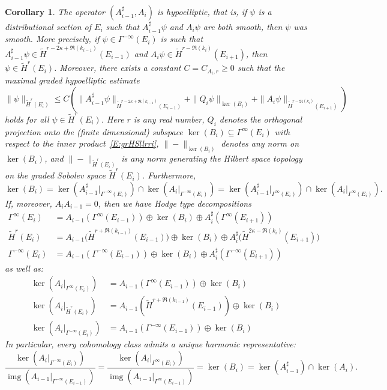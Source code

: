 \documentclass[reqno,12pt]{amsart}
\DeclareMathOperator{\img}{img}
\theoremstyle{plain}
\newtheorem{corollary}[theorem]{Corollary}
\theoremstyle{definition}
\begin{document}
\begin{corollary}\label{C:grHodge}
The operator $(A_{i-1}^\sharp,A_i)$ is hypoelliptic, that is, if $\psi$ is a distributional section of $E_i$ such that $A_{i-1}^\sharp\psi$ and $A_i\psi$ are both smooth, then $\psi$ was smooth.
More precisely, if $\psi\in\Gamma^{-\infty}(E_i)$ is such that $A_{i-1}^\sharp\psi\in\tilde H^{r-2\kappa+\Re(k_{i-1})}(E_{i-1})$ and $A_i\psi\in\tilde H^{r-\Re(k_i)}(E_{i+1})$, then $\psi\in\tilde H^r(E_i)$.
Moreover, there exists a constant $C=C_{A_i,r}\geq0$ such that the maximal graded hypoelliptic estimate
\begin{equation*}
\|\psi\|_{\tilde H^r(E_i)}\leq C\left(\|A^\sharp_{i-1}\psi\|_{\tilde H^{r-2\kappa+\Re(k_{i-1})}(E_{i-1})}+\|Q_i\psi\|_{\ker(B_i)}+\|A_i\psi\|_{\tilde H^{r-\Re(k_i)}(E_{i+1})}\right)
\end{equation*}
holds for all $\psi\in\tilde H^r(E_i)$.
Here $r$ is any real number, $Q_i$ denotes the orthogonal projection onto the (finite dimensional) subspace $\ker(B_i)\subseteq\Gamma^\infty(E_i)$ with respect to the inner product~\eqref{E:grHSllrri}, $\|-\|_{\ker(B_i)}$ denotes any norm on $\ker(B_i)$, and $\|-\|_{\tilde H^r(E_i)}$ is any norm generating the Hilbert space topology on the graded Sobolev space $\tilde H^r(E_i)$. 
Furthermore,
$$
\ker(B_i)=\ker(A_{i-1}^\sharp|_{\Gamma^{-\infty}(E_i)})\cap\ker(A_i|_{\Gamma^{-\infty}(E_i)})
=\ker(A_{i-1}^\sharp|_{\Gamma^\infty(E_i)})\cap\ker(A_i|_{\Gamma^\infty(E_i)}).
$$
If, moreover, $A_iA_{i-1}=0$, then we have Hodge type decompositions
\begin{align*}
\Gamma^\infty(E_i)&=A_{i-1}(\Gamma^\infty(E_{i-1}))\oplus\ker(B_i)\oplus A_i^\sharp(\Gamma^\infty(E_{i+1}))\\
\tilde H^r(E_i)&=A_{i-1}\bigl(\tilde H^{r+\Re(k_{i-1})}(E_{i-1})\bigr)\oplus\ker(B_i)\oplus A_i^\sharp\bigl(\tilde H^{2\kappa-\Re(k_i)}(E_{i+1})\bigr)\\
\Gamma^{-\infty}(E_i)&=A_{i-1}(\Gamma^{-\infty}(E_{i-1}))\oplus\ker(B_i)\oplus A_i^\sharp(\Gamma^{-\infty}(E_{i+1}))
\end{align*}
as well as:
\begin{align*}
\ker(A_i|_{\Gamma^\infty(E_i)})&=A_{i-1}(\Gamma^\infty(E_{i-1}))\oplus\ker(B_i)\\
\ker(A_i|_{\tilde H^r(E_i)})&=A_{i-1}(\tilde H^{r+\Re(k_{i-1})}(E_{i-1}))\oplus\ker(B_i)\\
\ker(A_i|_{\Gamma^{-\infty}(E_i)})&=A_{i-1}(\Gamma^{-\infty}(E_{i-1}))\oplus\ker(B_i)
\end{align*}
In particular, every cohomology class admits a unique harmonic representative:
$$
\frac{\ker(A_i|_{\Gamma^{-\infty}(E_i)})}{\img(A_{i-1}|_{\Gamma^{-\infty}(E_{i-1})})}
=\frac{\ker(A_i|_{\Gamma^\infty(E_i)})}{\img(A_{i-1}|_{\Gamma^\infty(E_{i-1})})}
=\ker(B_i)
=\ker(A_{i-1}^\sharp)\cap\ker(A_i).
$$
\end{corollary}
\end{document}
